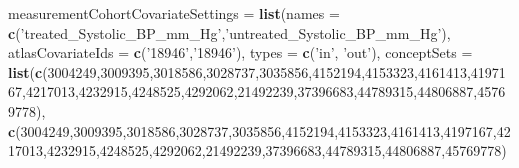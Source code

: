 \documentclass[
]{article}
\newenvironment{Shaded}{\begin{snugshade}}{\end{snugshade}}
\newcommand{\DataTypeTok}[1]{\textcolor[rgb]{0.13,0.29,0.53}{#1}}
\newcommand{\DecValTok}[1]{\textcolor[rgb]{0.00,0.00,0.81}{#1}}
\newcommand{\KeywordTok}[1]{\textcolor[rgb]{0.13,0.29,0.53}{\textbf{#1}}}
\newcommand{\NormalTok}[1]{#1}
\newcommand{\StringTok}[1]{\textcolor[rgb]{0.31,0.60,0.02}{#1}}
\begin{document}
\begin{Shaded}
\begin{Highlighting}[]
{{{{                      \DataTypeTok{measurementCohortCovariateSettings =} \KeywordTok{list}\NormalTok{(}\DataTypeTok{names =} \KeywordTok{c}\NormalTok{(}\StringTok{'treated_Systolic_BP_mm_Hg'}\NormalTok{,}\StringTok{'untreated_Systolic_BP_mm_Hg'}\NormalTok{),}
                                                                \DataTypeTok{atlasCovariateIds =} \KeywordTok{c}\NormalTok{(}\StringTok{'18946'}\NormalTok{,}\StringTok{'18946'}\NormalTok{),}
                                                                \DataTypeTok{types =} \KeywordTok{c}\NormalTok{(}\StringTok{'in'}\NormalTok{, }\StringTok{'out'}\NormalTok{),}
                                                                \DataTypeTok{conceptSets =} \KeywordTok{list}\NormalTok{(}\KeywordTok{c}\NormalTok{(}\DecValTok{3004249}\NormalTok{,}\DecValTok{3009395}\NormalTok{,}\DecValTok{3018586}\NormalTok{,}\DecValTok{3028737}\NormalTok{,}\DecValTok{3035856}\NormalTok{,}\DecValTok{4152194}\NormalTok{,}\DecValTok{4153323}\NormalTok{,}\DecValTok{4161413}\NormalTok{,}\DecValTok{4197167}\NormalTok{,}\DecValTok{4217013}\NormalTok{,}\DecValTok{4232915}\NormalTok{,}\DecValTok{4248525}\NormalTok{,}\DecValTok{4292062}\NormalTok{,}\DecValTok{21492239}\NormalTok{,}\DecValTok{37396683}\NormalTok{,}\DecValTok{44789315}\NormalTok{,}\DecValTok{44806887}\NormalTok{,}\DecValTok{45769778}\NormalTok{),}
                                                                                   \KeywordTok{c}\NormalTok{(}\DecValTok{3004249}\NormalTok{,}\DecValTok{3009395}\NormalTok{,}\DecValTok{3018586}\NormalTok{,}\DecValTok{3028737}\NormalTok{,}\DecValTok{3035856}\NormalTok{,}\DecValTok{4152194}\NormalTok{,}\DecValTok{4153323}\NormalTok{,}\DecValTok{4161413}\NormalTok{,}\DecValTok{4197167}\NormalTok{,}\DecValTok{4217013}\NormalTok{,}\DecValTok{4232915}\NormalTok{,}\DecValTok{4248525}\NormalTok{,}\DecValTok{4292062}\NormalTok{,}\DecValTok{21492239}\NormalTok{,}\DecValTok{37396683}\NormalTok{,}\DecValTok{44789315}\NormalTok{,}\DecValTok{44806887}\NormalTok{,}\DecValTok{45769778}\NormalTok{)}
                                                                                   
}}}}
\end{Highlighting}
\end{Shaded}
\end{document}
